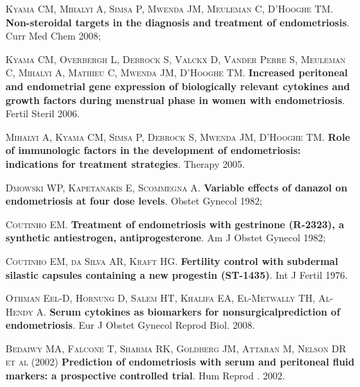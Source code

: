 \documentclass[12pt]{article} %
\begin{document}
\vspace{0,5cm}

\textsc{Kyama CM, Mihalyi A, Simsa P, Mwenda JM, Meuleman C, D'Hooghe TM}.\textbf{ Non-steroidal targets in the diagnosis and treatment of endometriosis}. Curr Med Chem 2008;

\vspace{0,5cm}

\textsc{Kyama CM, Overbergh L, Debrock S, Valckx D, Vander Perre S, Meuleman C, Mihalyi A, Mathieu C, Mwenda JM, D'Hooghe TM}.
\textbf{Increased peritoneal and endometrial gene expression of biologically relevant cytokines and growth factors during menstrual phase in women with endometriosis}. Fertil Steril 2006.

\vspace{0,5cm}

\textsc{Mihalyi A, Kyama CM, Simsa P, Debrock S, Mwenda JM, D'Hooghe TM}.
\textbf{Role of immunologic factors in the development of endometriosis: indications for treatment strategies}. Therapy 2005.

\vspace{0,5cm}

\textsc{Dmowski WP, Kapetanakis E, Scommegna A}. \textbf{Variable effects of danazol on endometriosis at four dose levels}. Obstet Gynecol 1982;

\vspace{0,5cm}

\textsc{ Coutinho EM}.\textbf{ Treatment of endometriosis with gestrinone (R-2323), a synthetic antiestrogen, antiprogesterone}. Am J Obstet Gynecol 1982; 

\vspace{0,5cm}
 
\textsc{Coutinho EM, da Silva AR, Kraft HG}. \textbf{Fertility control with subdermal silastic capsules containing a new progestin (ST-1435)}. Int J Fertil 1976.

\vspace{0,5cm}

\textsc{Othman Eel-D, Hornung D, Salem HT, Khalifa EA, El-Metwally
TH, Al-Hendy A}.\textbf{ Serum cytokines as biomarkers for nonsurgicalprediction of endometriosis}. Eur J Obstet Gynecol Reprod Biol.
2008.

\vspace{0,5cm}

\textsc{Bedaiwy MA, Falcone T, Sharma RK, Goldberg JM, Attaran M,
Nelson DR et al} (2002)\textbf{ Prediction of endometriosis with serum
and peritoneal fluid markers: a prospective controlled trial}. Hum
Reprod . 2002.
\end{document}

